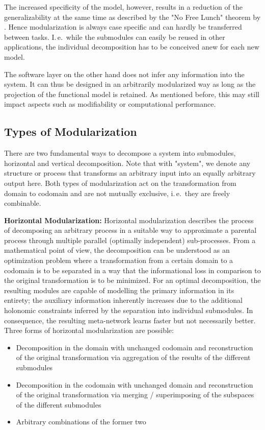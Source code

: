 \documentclass[conference]{IEEEtran}
\begin{document}
The increased specificity of the model, however, results in a reduction of the generalizability at the same time as described by the "No Free Lunch" theorem by \cite{Wolpert1997-fu}. Hence modularization is always case specific and can hardly be transferred between tasks. I.\,e.\, while the submodules can easily be reused in other applications, the individual decomposition has to be conceived anew for each new model.

The software layer on the other hand does not infer any information into the system. It can thus be designed in an arbitrarily modularized way as long as the projection of the functional model is retained. As mentioned before, this may still impact aspects such as modifiability or computational performance.

\subsection{Types of Modularization%
            \label{sec:compnet_types}}

There are two fundamental ways to decompose a system into submodules, horizontal and vertical decomposition. Note that with "system", we denote any structure or process that transforms an arbitrary input into an equally arbitrary output here. Both types of modularization act on the transformation from domain to codomain and are not mutually exclusive, i.\,e.\ they are freely combinable.

\textbf{Horizontal Modularization:} Horizontal modularization describes the process of decomposing an arbitrary process in a suitable way to approximate a parental process through multiple parallel (optimally independent) sub-processes. From a mathematical point of view, the decomposition can be understood as an optimization problem where a transformation from a certain domain to a codomain is to be separated in a way that the informational loss in comparison to the original transformation is to be minimized. For an optimal decomposition, the resulting modules are capable of modelling the primary information in its entirety; the auxiliary information inherently increases due to the additional holonomic constraints inferred by the separation into individual submodules. In consequence, the resulting meta-network learns faster but not necessarily better. Three forms of horizontal modularization are possible:

\vspace{\baselineskip}
\begin{itemize}
    \item Decomposition in the domain with unchanged codomain and reconstruction of the original transformation via aggregation of the results of the different submodules
    \item Decomposition in the codomain with unchanged domain and reconstruction of the original transformation via merging / superimposing of the subspaces of the different submodules
    \item Arbitrary combinations of the former two
\end{itemize}
\vspace{\baselineskip}
\end{document}
